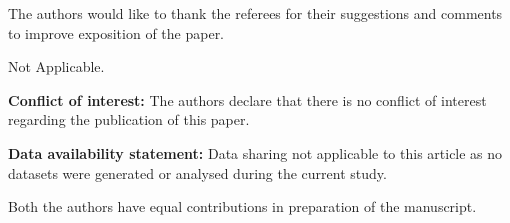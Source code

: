 \documentclass[a4paper,12pt]{amsart}
\theoremstyle{plain}
\theoremstyle{definition}
\begin{document}
 The authors would like to thank the referees for their suggestions and comments to improve exposition of the paper. \vspace{1.2mm}

 Not Applicable.\vspace{1.2mm}

\noindent\textbf{Conflict of interest:} The authors declare that there is no conflict  of interest regarding the publication of this paper.\vspace{1.2mm}

\noindent\textbf{Data availability statement:}  Data sharing not applicable to this article as no datasets were generated or analysed during the current study.\vspace{1.2mm}

 Both the authors have equal contributions in preparation of the manuscript.
\end{document}
